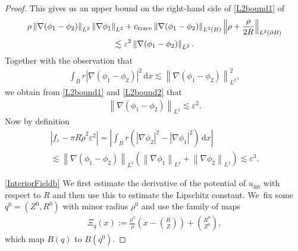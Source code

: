 \documentclass[JEP,XML,SOM,Unicode,published]{cedram}
\let\epsilon\varepsilon
\theoremstyle{definition}
\newcommand\norm[1]{\left\lVert #1\right\rVert}
\newcommand\Bnorm[1]{\Bigl\lVert #1\Bigr\rVert}
\newcommand\eq{=}
\newcommand\dd{\,\mathrm{d}}
\newcommand\dx{\dd x}
\let\de\partial
\let\eps\epsilon
\begin{document}
\begin{proof}
This gives us an upper bound on the right-hand side of \eqref{L2bound1} of
\begin{multline}\label{L2bound2}
\rho\norm{\nabla(\phi_1-\phi_2)}_{L^2}\norm{\nabla\phi_1}_{L^2}+c_\mathrm{trace}\norm{\nabla(\phi_1-\phi_2)}_{L^2(B)}\Bnorm{\rho+\frac{\rho}{2R}}_{L^2(\de B)}\\
\lesssim \eps^2\norm{\nabla(\phi_1-\phi_2)}_{L^2}.
\end{multline}
Together with the observation that
\begin{align*}
\int_{B}r|\nabla(\phi_1-\phi_2)|^2\dx\lesssim \norm{\nabla(\phi_1-\phi_2)}_{L^2}^2,
\end{align*}
we obtain from \eqref{L2bound1} and \eqref{L2bound2} that
\begin{align*}
\norm{\nabla(\phi_1-\phi_2)}_{L^2}\lesssim \eps^2.
\end{align*}
Now by definition
\begin{multline*}
|f_\eps-\pi R\tilde{\rho}^2\eps^2|\eq \left|\int_B r\left(|\nabla\phi_2|^2-|\nabla\phi_1|^2\right)\dx\right|\\
\lesssim \norm{\nabla(\phi_1-\phi_2)}_{L^2}\left(\norm{\nabla\phi_1}_{L^2}+\norm{\nabla\phi_2}_{L^2}\right)
\lesssim\eps^3.
\end{multline*}
\vphantom{a}

\eqref{InteriorFieldb}
We first estimate the derivative of the potential of $u_\mathrm{int}$ with respect to $R$ and then use this to estimate the Lipschitz constant. We~fix some $q^0=(Z^0,R^0)$ with minor radius $\rho^0$ and use the family of maps
\begin{align*}\Xi_q(x):=\frac{\rho^0}{\rho}\left(x-\binom{R}{Z}\right)+\binom{R^0}{Z^0},
\end{align*}
which map $B(q)$ to $B(q^0)$.


\end{proof}
\end{document}
